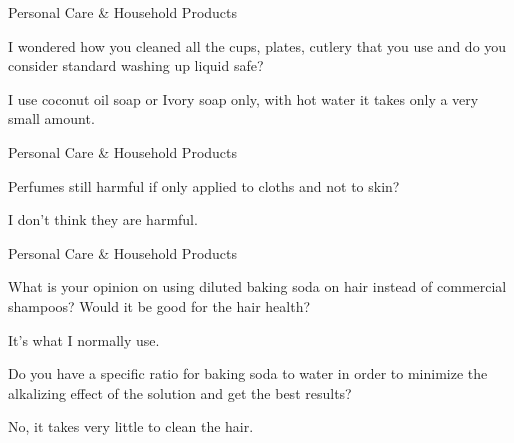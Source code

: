 \documentclass[11pt,oneside,openany,extrafontsizes]{memoir}
\begin{document}
\begin{qaexchange}{Personal Care \& Household Products}

    \begin{question}
        I wondered how you cleaned all the cups, plates, cutlery that you use and do you consider standard washing up liquid safe?
    \end{question}

    \begin{answer}
       I use coconut oil soap or Ivory soap only, with hot water it takes only a very small amount. 
    \end{answer}
\end{qaexchange}

\begin{qaexchange}{Personal Care \& Household Products}

    \begin{question}
         Perfumes still harmful if only applied to cloths and not to skin?
    \end{question}

    \begin{answer}
       I don't think they are harmful. 
    \end{answer}
\end{qaexchange}

\begin{emailexchange}{Personal Care \& Household Products}

    \begin{question}
        What is your opinion on using diluted baking soda on hair instead of commercial shampoos? Would it be good for the hair health?
    \end{question}

    \begin{answer}
      It's what I normally use.
    \end{answer}

    \begin{question}
        Do you have a specific ratio for baking soda to water in order to minimize the alkalizing effect of the solution and get the best results?
    \end{question}

    \begin{answer}
      No, it takes very little to clean the hair.
    \end{answer}
\end{emailexchange}
\end{document}
